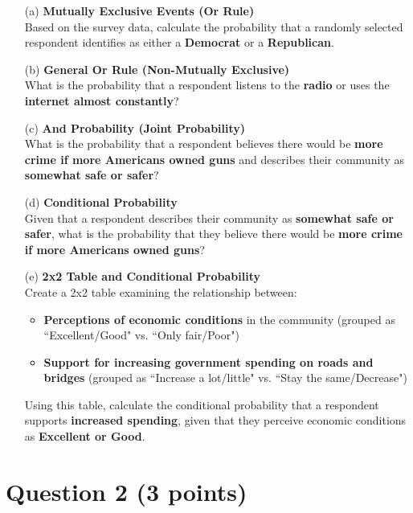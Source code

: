 \documentclass[11pt]{article}
\begin{document}
\begin{itemize}
    \item[(a)] \textbf{Mutually Exclusive Events (Or Rule)} \\
    Based on the survey data, calculate the probability that a randomly selected respondent identifies as either a \textbf{Democrat} or a \textbf{Republican}. 

    \item[(b)] \textbf{General Or Rule (Non-Mutually Exclusive)} \\
    What is the probability that a respondent listens to the \textbf{radio} or uses the \textbf{internet almost constantly}?

    \item[(c)] \textbf{And Probability (Joint Probability)} \\
    What is the probability that a respondent believes there would be \textbf{more crime if more Americans owned guns} and describes their community as \textbf{somewhat safe or safer}?

    \item[(d)] \textbf{Conditional Probability} \\
    Given that a respondent describes their community as \textbf{somewhat safe or safer}, what is the probability that they believe there would be \textbf{more crime if more Americans owned guns}?

    \item[(e)] \textbf{2x2 Table and Conditional Probability} \\
    Create a 2x2 table examining the relationship between:
    \begin{itemize}
        \item \textbf{Perceptions of economic conditions} in the community (grouped as ``Excellent/Good" vs. ``Only fair/Poor")
        \item \textbf{Support for increasing government spending on roads and bridges} (grouped as ``Increase a lot/little" vs. ``Stay the same/Decrease")
    \end{itemize}
    Using this table, calculate the conditional probability that a respondent supports \textbf{increased spending}, given that they perceive economic conditions as \textbf{Excellent or Good}.
\end{itemize}


\newpage
\section*{Question 2 (3 points)}
\end{document}
